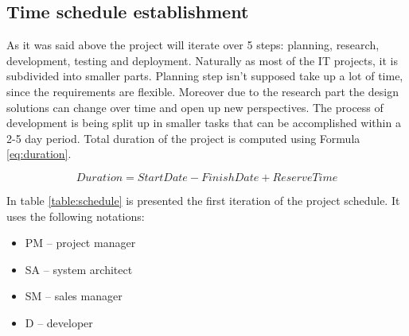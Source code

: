 \documentclass[12pt,a4paper]{report}
\begin{document}
\subsection{Time schedule establishment}
As it was said above the project will iterate over 5 steps: planning, research, development, testing and deployment. Naturally as most of the IT projects, it is subdivided into smaller parts. Planning step isn't supposed take up a lot of time, since the requirements are flexible. Moreover due to the research part the design solutions can change over time and open up new perspectives. The process of development is being split up in smaller tasks that can be accomplished within a 2-5 day period. Total duration of the project is computed using Formula \eqref{eq:duration}.

\begin{equation} \label{eq:duration}
 Duration = StartDate - FinishDate + ReserveTime
\end{equation}

In table \ref{table:schedule} is presented the first iteration of the project schedule. It uses the following notations: 
\begin{itemize}
 \item PM -- project manager
 \item SA -- system architect
 \item SM -- sales manager
 \item D -- developer
\end{itemize}
\end{document}
